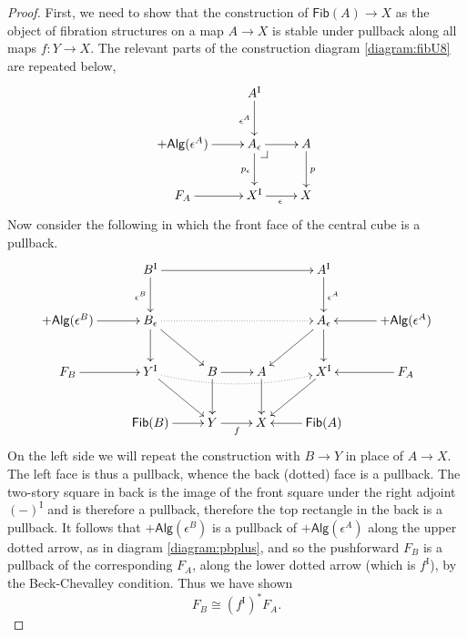 \documentclass[12pt]{article}
\makeatletter
\newcommand{\pbcorner}[1][dr]{\save*!/#1-1.2pc/#1:(-1,1)@^{|-}\restore}
\newcommand{\ra}{\ensuremath{\rightarrow}}
\newcommand{\I}{\ensuremath{\mathrm{I}}}
\newcommand{\Fib}{\ensuremath{\mathsf{Fib}}}
\theoremstyle{remark}
\theoremstyle{definition}
\makeatother
\begin{document}
\begin{proof}
First, we need to show that the construction of $\Fib(A)\ra X$ as the object of fibration structures on a map $A\ra X$ is stable under pullback along all maps $f : Y\ra X$.
The relevant parts of the construction diagram \eqref{diagram:fibU8} are repeated below,
\begin{equation}\label{diagram:fibU8}
\xymatrix{
&A^\I \ar[d]_{\epsilon^A} & \\
+\mathsf{Alg}(\epsilon^A) \ar[r] & A_\epsilon\ar[d]_{p_\epsilon} \ar[r] \pbcorner & A \ar[d]^{p} \\
F_A \ar[r] & X^\I \ar[r]_{\epsilon} &  X 
}
\end{equation}
Now consider the following in which the front face of the central cube is a pullback.
\begin{equation}\label{diagram:fibU9}
\xymatrix{
 & B^\I \ar[rrr] \ar[d]_{\epsilon^B} &&& A^\I \ar[d]^{\epsilon^A} &\\
 +\mathsf{Alg}(\epsilon^B) \ar[r] & B_\epsilon \ar[d] \ar[rd] \ar@{.>}[rrr] &&& A_\epsilon \ar[d] \ar[ld] &  +\mathsf{Alg}(\epsilon^A) \ar[l] \\
 F_B  \ar[r] & Y^\I \ar[rd] \ar@{.>}@/_.75pc/[rrr] & B \ar[r] \ar[d] & A \ar[d] &  X^\I \ar[ld]  & \ar[l] F_A \\
 &\Fib(B) \ar[r] & Y \ar[r]_f & X &\Fib(A) \ar[l] &
 }
\end{equation}
On the left side we will repeat the construction with $B \ra Y$ in place of $A\ra X$.  
The left face is thus a pullback, whence the back (dotted) face is a pullback.  The two-story square in back is the image of the front square under the right adjoint $(-)^\I$ and is therefore a  pullback, therefore the top rectangle in the back is a pullback. 
It follows that $+\mathsf{Alg}(\epsilon^B)$ is a pullback of $+\mathsf{Alg}(\epsilon^A)$ along the upper dotted arrow, as in diagram \eqref{diagram:pbplus}, and so the pushforward $F_B$ is a pullback of the corresponding $F_A$, along the lower dotted arrow (which is $f^\I$), by the Beck-Chevalley condition.  Thus we have shown
\begin{equation}\label{eq:pbFB}
F_B \cong (f^\I)^*F_A.
\end{equation}


\end{proof}
\end{document}
